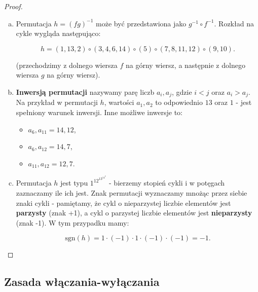 \documentclass[11pt]{article}
\theoremstyle{definition}
\numberwithin{zadanie}{subsection}
\begin{document}
\begin{proof}
    \begin{enumerate}[a)]
        \item Permutacja $h=(fg)^{-1}$ może być przedstawiona jako $g^{-1}\circ f^{-1}$. Rozkład na cykle wygląda następująco:

              $$
                  h =
                  (1, 13, 2)
                  \circ
                  (3, 4, 6, 14)
                  \circ
                  (5)
                  \circ
                  (7, 8, 11, 12)
                  \circ
                  (9, 10).
              $$

              (przechodzimy z dolnego wiersza $f$ na górny wiersz, a następnie z dolnego wiersza $g$ na górny wiersz).

        \item \textbf{Inwersją permutacji} nazywamy parę liczb $a_i, a_j$, gdzie $i<j$ oraz $a_i > a_j$. Na przykład w permutacji $h$, wartości $a_1, a_2$ to odpowiednio $13$ oraz $1$ - jest spełniony warunek inwersji. Inne możliwe inwersje to:

              \begin{itemize}
                  \item $a_6, a_{11} = 14, 12$,
                  \item $a_6, a_{12} = 14, 7$,
                  \item $a_{11}, a_{12} = 12, 7$.
              \end{itemize}

        \item Permutacja $h$ jest typu $1^12^13^14^2$ - bierzemy stopień cykli i w potęgach zaznaczamy ile ich jest. Znak permutacji wyznaczamy mnożąc przez siebie znaki cykli - pamiętamy, że cykl o nieparzystej liczbie elementów jest \textbf{parzysty} (znak +1), a cykl o parzystej liczbie elementów jest \textbf{nieparzysty} (znak -1). W tym przypadku mamy:

              $$\text{sgn}(h) = 1\cdot(-1)\cdot 1\cdot (-1)\cdot (-1) = -1.$$

    \end{enumerate}
\end{proof}


\subsection{Zasada włączania-wyłączania}
\end{document}
